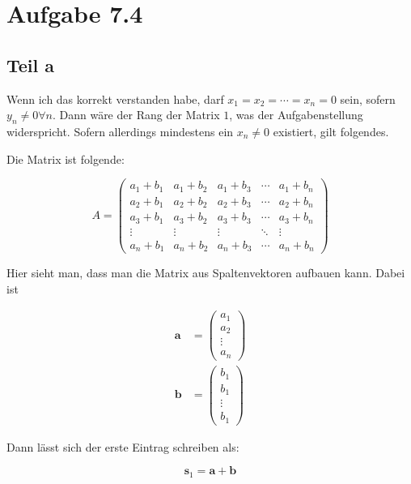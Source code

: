 \documentclass[a4paper,german,12pt,smallheadings]{scrartcl}
\begin{document}
\section*{Aufgabe 7.4}
\subsection*{Teil a}

Wenn ich das korrekt verstanden habe, darf $x_1 = x_2 = \dotsb = x_n = 0$ sein,
sofern $y_n \neq 0 \forall n$. Dann wäre der Rang der Matrix $1$, was der
Aufgabenstellung widerspricht. Sofern allerdings mindestens ein $x_n \neq 0$
existiert, gilt folgendes.

Die Matrix ist folgende:

\begin{equation*}
A =
  \begin{pmatrix}
    a_1 + b_1 & a_1 + b_2 & a_1 + b_3 & \dotsb & a_1 + b_n \\
    a_2 + b_1 & a_2 + b_2 & a_2 + b_3 & \dotsb & a_2 + b_n \\
    a_3 + b_1 & a_3 + b_2 & a_3 + b_3 & \dotsb & a_3 + b_n \\
    \vdots    & \vdots    & \vdots    & \ddots & \vdots \\
    a_n + b_1 & a_n + b_2 & a_n + b_3 & \dotsb & a_n + b_n
  \end{pmatrix}
\end{equation*}

Hier sieht man, dass man die Matrix aus Spaltenvektoren aufbauen kann. Dabei ist

\begin{align*}
  \mathbf{a} &= \begin{pmatrix} a_1 \\ a_2 \\ \vdots \\ a_n \end{pmatrix} \\
  \mathbf{b} &= \begin{pmatrix} b_1 \\ b_1 \\ \vdots \\ b_1 \end{pmatrix}
\end{align*}

Dann lässt sich der erste Eintrag schreiben als:

\begin{equation*}
  \mathbf{s}_1 = \mathbf{a} + \mathbf{b}
\end{equation*}
\end{document}
